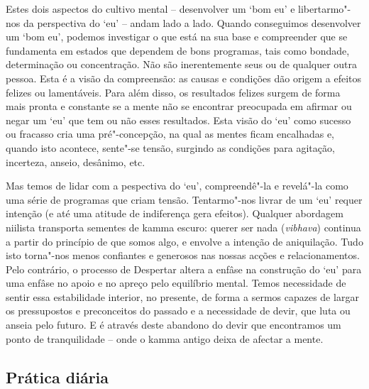 \enlargethispage{2\baselineskip}

Estes dois aspectos do cultivo mental -- desenvolver um `bom eu' e
libertarmo"-nos da perspectiva do `eu' -- andam lado a lado. Quando conseguimos
desenvolver um `bom eu', podemos investigar o que está na sua base e compreender
que se fundamenta em estados que dependem de bons programas, tais como bondade,
determinação ou concentração. Não são inerentemente seus ou de qualquer outra
pessoa. Esta é a visão da compreensão: as causas e condições dão origem a
efeitos felizes ou lamentáveis. Para além disso, os resultados felizes surgem de
forma mais pronta e constante se a mente não se encontrar preocupada em afirmar
ou negar um `eu' que tem ou não esses resultados. Esta visão do `eu' como
sucesso ou fracasso cria uma pré"-concepção, na qual as mentes ficam encalhadas
e, quando isto acontece, sente"-se tensão, surgindo as condições para agitação,
incerteza, anseio, desânimo, etc.

Mas temos de lidar com a pespectiva do `eu', compreendê"-la e revelá"-la como uma
série de programas que criam tensão. Tentarmo"-nos livrar de um `eu' requer
intenção (e até uma atitude de indiferença gera efeitos). Qualquer abordagem
niilista transporta sementes de kamma escuro: querer ser nada (\emph{vibhava})
continua a partir do princípio de que somos algo, e envolve a intenção de
aniquilação. Tudo isto torna"-nos menos confiantes e generosos nas nossas acções
e relacionamentos. Pelo contrário, o processo de Despertar altera a enfâse na
construção do `eu' para uma enfâse no apoio e no apreço pelo equilíbrio mental.
Temos necessidade de sentir essa estabilidade interior, no presente, de forma a
sermos capazes de largar os pressupostos e preconceitos do passado e a
necessidade de devir, que luta ou anseia pelo futuro. E é através deste abandono
do devir que encontramos um ponto de tranquilidade -- onde o kamma antigo deixa
de afectar a mente.

\subsection{Prática diária}

